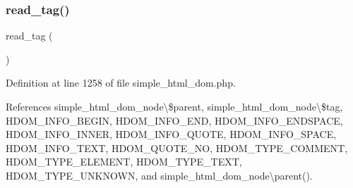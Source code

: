 \subsubsection{\texorpdfstring{read\+\_\+tag()}{read\_tag()}}
{\footnotesize\ttfamily read\+\_\+tag (\begin{DoxyParamCaption}{ }\end{DoxyParamCaption})\hspace{0.3cm}{\ttfamily [protected]}}



Definition at line 1258 of file simple\+\_\+html\+\_\+dom.\+php.



References simple\+\_\+html\+\_\+dom\+\_\+node\textbackslash{}\$parent, simple\+\_\+html\+\_\+dom\+\_\+node\textbackslash{}\$tag, H\+D\+O\+M\+\_\+\+I\+N\+F\+O\+\_\+\+B\+E\+G\+IN, H\+D\+O\+M\+\_\+\+I\+N\+F\+O\+\_\+\+E\+ND, H\+D\+O\+M\+\_\+\+I\+N\+F\+O\+\_\+\+E\+N\+D\+S\+P\+A\+CE, H\+D\+O\+M\+\_\+\+I\+N\+F\+O\+\_\+\+I\+N\+N\+ER, H\+D\+O\+M\+\_\+\+I\+N\+F\+O\+\_\+\+Q\+U\+O\+TE, H\+D\+O\+M\+\_\+\+I\+N\+F\+O\+\_\+\+S\+P\+A\+CE, H\+D\+O\+M\+\_\+\+I\+N\+F\+O\+\_\+\+T\+E\+XT, H\+D\+O\+M\+\_\+\+Q\+U\+O\+T\+E\+\_\+\+NO, H\+D\+O\+M\+\_\+\+T\+Y\+P\+E\+\_\+\+C\+O\+M\+M\+E\+NT, H\+D\+O\+M\+\_\+\+T\+Y\+P\+E\+\_\+\+E\+L\+E\+M\+E\+NT, H\+D\+O\+M\+\_\+\+T\+Y\+P\+E\+\_\+\+T\+E\+XT, H\+D\+O\+M\+\_\+\+T\+Y\+P\+E\+\_\+\+U\+N\+K\+N\+O\+WN, and simple\+\_\+html\+\_\+dom\+\_\+node\textbackslash{}parent().


